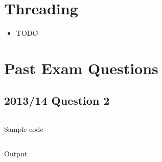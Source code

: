 \documentclass[a4paper]{article}
\begin{document}
\section{Threading}

\begin{itemize}
  \item
    TODO

\end{itemize}

\section{Past Exam Questions}

\subsection{2013/14 Question 2}

\begin{listing}[h!]
  \inputminted[linenos,frame=lines]{cpp}{listings/csc8501_pp1314_q2.cpp}
  \caption{Sample code}
  \label{listing:csc8501_pp1314_q2}
\end{listing}
\FloatBarrier

\begin{listing}[h!]
  \inputminted[linenos,frame=lines]{text}{out/csc8501_pp1314_q2.txt}
  \caption{Output}
  \label{listing:csc8501_pp1314_q2}
\end{listing}
\FloatBarrier
\end{document}
